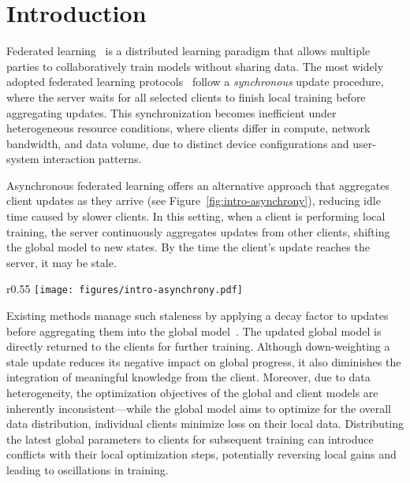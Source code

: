 \section{Introduction}
Federated learning~\cite{mcmahan2017communication} is a distributed learning paradigm that allows multiple parties to collaboratively train models without sharing data. The most widely adopted federated learning protocols~\cite{mcmahan2017communication,li2020federated,karimireddy2020scaffold,li2021model,wang2020tackling,zhang2023navigating,zhang2024few} follow a \textit{synchronous} update procedure, where the server waits for all selected clients to finish local training before aggregating updates. This synchronization becomes inefficient under heterogeneous resource conditions, where clients differ in compute, network bandwidth, and data volume, due to distinct device configurations and user-system interaction patterns. 

Asynchronous federated learning offers an alternative approach that aggregates client updates as they arrive (see Figure~\ref{fig:intro-asynchrony}), reducing idle time caused by slower clients. In this setting, when a client is performing local training, the server continuously aggregates updates from other clients, shifting the global model to new states. By the time the client's update reaches the server, it may be stale. 
\begin{wrapfigure}{r}{0.55\textwidth}
\centering
    \texttt{[image: figures/intro-asynchrony.pdf]}
    \caption{Time synchrony in federated learning. Asynchronous methods reduce idle time and improve resource utilization, suited for large-scale deployments.}
\label{fig:intro-asynchrony}
\end{wrapfigure}
Existing methods manage such staleness by applying a decay factor to updates before aggregating them into the global model~\cite{xie2019asynchronous,liu2024fedasmu,zang2024efficient,su2022asynchronous}. The updated global model is directly returned to the clients for further training. Although down-weighting a stale update reduces its negative impact on global progress, it also diminishes the integration of meaningful knowledge from the client. Moreover, due to data heterogeneity, the optimization objectives of the global and client models are inherently inconsistent---while the global model aims to optimize for the overall data distribution, individual clients minimize loss on their local data. Distributing the latest global parameters to clients for subsequent training can introduce conflicts with their local optimization steps, potentially reversing local gains and leading to oscillations in training.

